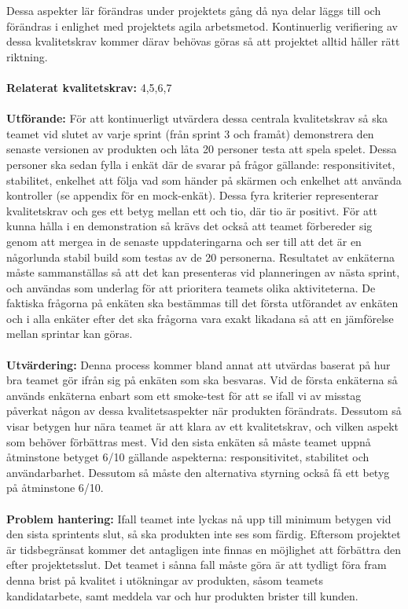 \documentclass[10pt]{article}
\begin{document}
	Dessa aspekter lär förändras under projektets gång då nya delar läggs till och förändras i enlighet med projektets agila arbetsmetod. Kontinuerlig verifiering av dessa kvalitetskrav kommer därav behövas göras så att projektet alltid håller rätt riktning.
	\\\\
	\textbf{Relaterat kvalitetskrav:} 4,5,6,7
	\\\\
	\textbf{Utförande:} För att kontinuerligt utvärdera dessa centrala kvalitetskrav så ska teamet vid slutet av varje sprint (från sprint 3 och framåt) demonstrera den senaste versionen av produkten och låta 20 personer testa att spela spelet. Dessa personer ska sedan fylla i enkät där de svarar på frågor gällande: responsitivitet, stabilitet, enkelhet att följa vad som händer på skärmen och enkelhet att använda kontroller (se appendix för en mock-enkät). Dessa fyra kriterier representerar kvalitetskrav och ges ett betyg mellan ett och tio, där tio är positivt. För att kunna hålla i en demonstration så krävs det också att teamet förbereder sig genom att mergea in de senaste uppdateringarna och ser till att det är en någorlunda stabil build som testas av de 20 personerna. Resultatet av enkäterna måste sammanställas så att det kan presenteras vid planneringen av nästa sprint, och användas som underlag för att prioritera teamets olika aktiviteterna. De faktiska frågorna på enkäten ska bestämmas till det första utförandet av enkäten och i alla enkäter efter det ska frågorna vara exakt likadana så att en jämförelse mellan sprintar kan göras.
	\\\\
	\textbf{Utvärdering:} Denna process kommer bland annat att utvärdas baserat på hur bra teamet gör ifrån sig på enkäten som ska besvaras. Vid de första enkäterna så används enkäterna enbart som ett smoke-test för att se ifall vi av misstag påverkat någon av dessa kvalitetsaspekter när produkten förändrats. Dessutom så visar betygen hur nära teamet är att klara av ett kvalitetskrav, och vilken aspekt som behöver förbättras mest. Vid den sista enkäten så måste teamet uppnå åtminstone betyget 6/10 gällande aspekterna: responsitivitet, stabilitet och användarbarhet. Dessutom så måste den alternativa styrning också få ett betyg på åtminstone 6/10.
	\\\\
	\textbf{Problem hantering:} Ifall teamet inte lyckas nå upp till minimum betygen vid den sista sprintents slut, så ska produkten inte ses som färdig. Eftersom projektet är tidsbegränsat kommer det antagligen inte finnas en möjlighet att förbättra den efter projektetsslut. Det teamet i sånna fall måste göra är att tydligt föra fram denna brist på kvalitet i utökningar av produkten, såsom teamets kandidatarbete, samt meddela var och hur produkten brister till kunden.
\end{document}
